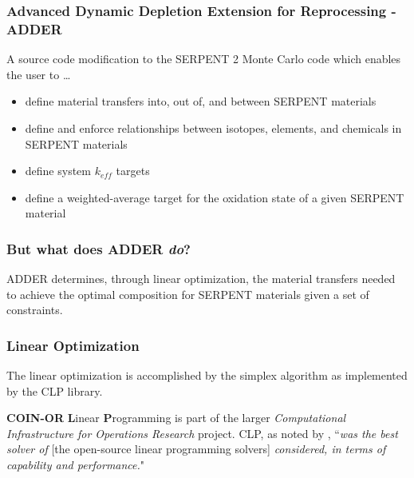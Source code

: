 \documentclass{beamer}
\begin{document}
\begin{frame}
\frametitle{Advanced Dynamic Depletion Extension for Reprocessing - ADDER}

A source code modification to the SERPENT 2 Monte Carlo code which enables the
user to \ldots

    \begin{itemize}
        \item define material transfers into, out of, and between SERPENT materials
        \item define and enforce relationships between isotopes, elements, and chemicals in SERPENT materials
        \item define system $k_{eff}$ targets
        \item define a weighted-average target for the oxidation state of a given SERPENT material
    \end{itemize}

\end{frame}

\begin{frame}
\frametitle{But what does ADDER \textit{do}?}

    ADDER determines, through linear optimization, the material transfers
    needed to achieve the optimal composition for SERPENT materials given a set
    of constraints.

\end{frame}

\begin{frame}
\frametitle{Linear Optimization}

    The linear optimization is accomplished by the simplex algorithm as
    implemented by the CLP library.

    \hspace{2cm}

    \textbf{COIN-OR} \textbf{L}inear \textbf{P}rogramming is part of the larger
    \textit{Computational Infrastructure for Operations Research} project.
    CLP, as noted by 
    \cite{gearhart_comparison_2013}, ``\textit{was the best solver of}
    [the open-source linear programming solvers] \textit{considered, in terms 
    of capability and performance.}"

\end{frame}
\end{document}
